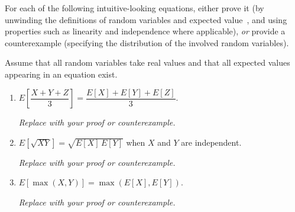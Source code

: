 \documentclass[dvipsnames]{article}
\begin{document}
\newpage\color{black}
\begin{problem}
  For each of the following intuitive-looking equations, either prove it (by unwinding the definitions of random variables and expected value~\cite[\S B.2--B.3]{CLRS-2022}, and using properties such as linearity and independence where applicable), \emph{or} provide a counterexample (specifying the distribution of the involved random variables).

  Assume that all random variables take real values and that all expected values appearing in an equation exist.

  \begin{enumerate}
    \item \(E\!\left[\dfrac{X + Y + Z}{3}\right] = \dfrac{E[X] + E[Y] + E[Z]}{3}\).

\color{purple}
\begin{mdframed}
  \color{purple}
  \emph{Replace with your proof or counterexample.}
\end{mdframed}

\color{black}\noindent
    \item \(E[\sqrt{XY}] = \sqrt{E[X]\,E[Y]}\) when \(X\) and \(Y\) are independent.

\color{purple}
\begin{mdframed}
  \color{purple}
  \emph{Replace with your proof or counterexample.}
\end{mdframed}

\color{black}\noindent
    \item \(E[\max(X, Y)] = \max(E[X], E[Y])\).

\color{purple}
\begin{mdframed}
  \color{purple}
  \emph{Replace with your proof or counterexample.}
\end{mdframed}


\end{enumerate}
\end{problem}
\end{document}

